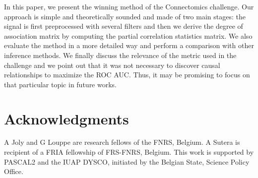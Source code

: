 \documentclass[wcp]{jmlr}
\begin{document}
In this paper, we present the winning method of the Connectomics challenge. Our
approach is simple and theoretically sounded and made of two main stages: the
signal is first preprocessed with several filters and then we derive the degree
of association matrix by computing the partial correlation statistics matrix.
We also evaluate the method in a more detailed way and perform a comparison
with other inference methods. We finally discuss the relevance of the metric
used in the challenge and we point out that it was not necessary to discover
causal relationships to maximize the ROC AUC. Thus, it may be  promising to
focus on that particular topic in future works.





\section*{Acknowledgments}
A Joly and G Louppe are research fellows of the FNRS, Belgium.  A Sutera is
recipient of a FRIA fellowship of FRS-FNRS, Belgium. This work is supported by
PASCAL2 and the IUAP DYSCO, initiated by the Belgian State, Science Policy
Office.



\newpage
\clearpage


\end{document}
